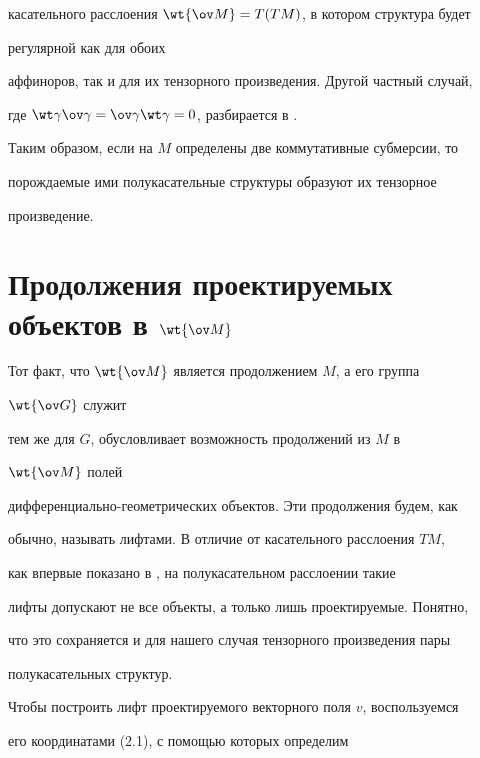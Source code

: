 касательного расслоения $\wt{\ov M}=T(TM)$, в котором структура будет


регулярной как для обоих


аффиноров, так и для их тензорного произведения. Другой частный случай,


где $\wt\gamma\ov\gamma=\ov\gamma\wt\gamma=0$, разбирается в \cite{5}.





Таким образом, если на $M$ определены две коммутативные субмерсии, то


порождаемые ими полукасательные структуры образуют их тензорное


произведение.





\section{Продолжения проектируемых объектов в $\wt{\ov M}$}





Тот факт, что $\wt{\ov M}$ является продолжением $M$, а его группа


$\wt{\ov G}$ служит


тем же для $G$, обусловливает возможность продолжений из $M$ в


$\wt{\ov M}$ полей


дифференциально-геометрических объектов. Эти продолжения будем, как


обычно, называть лифтами. В отличие от касательного расслоения $TM$,


как впервые показано в \cite{6}, на полукасательном расслоении такие


лифты допускают не все объекты, а только лишь проектируемые. Понятно,


что это сохраняется и для нашего случая тензорного произведения пары


полукасательных структур.





Чтобы построить лифт проектируемого векторного поля $v$, воспользуемся


его координатами (2.1), с помощью которых определим


